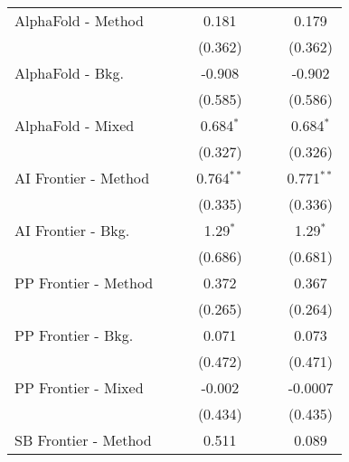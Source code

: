 \begin{tabular}{lcccccc}
   AlphaFold - Method           &               &             & 0.181        &               &             & 0.179\\   
                                &               &             & (0.362)      &               &             & (0.362)\\   
   AlphaFold - Bkg.             &               &             & -0.908       &               &             & -0.902\\   
                                &               &             & (0.585)      &               &             & (0.586)\\   
   AlphaFold - Mixed            &               &             & 0.684$^{*}$  &               &             & 0.684$^{*}$\\   
                                &               &             & (0.327)      &               &             & (0.326)\\   
   AI Frontier - Method         &               &             & 0.764$^{**}$ &               &             & 0.771$^{**}$\\   
                                &               &             & (0.335)      &               &             & (0.336)\\   
   AI Frontier - Bkg.           &               &             & 1.29$^{*}$   &               &             & 1.29$^{*}$\\   
                                &               &             & (0.686)      &               &             & (0.681)\\   
   PP Frontier - Method         &               &             & 0.372        &               &             & 0.367\\   
                                &               &             & (0.265)      &               &             & (0.264)\\   
   PP Frontier - Bkg.           &               &             & 0.071        &               &             & 0.073\\   
                                &               &             & (0.472)      &               &             & (0.471)\\   
   PP Frontier - Mixed          &               &             & -0.002       &               &             & -0.0007\\   
                                &               &             & (0.434)      &               &             & (0.435)\\   
   SB Frontier - Method         &               &             & 0.511        &               &             & 0.089\\   

\end{tabular}
